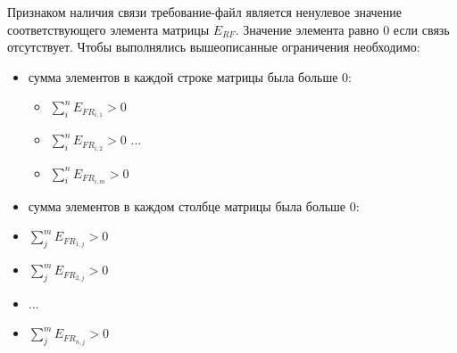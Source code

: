 \documentclass{article}
\begin{document}
  Признаком наличия связи требование-файл является ненулевое значение соответствующего элемента матрицы $E_{RF}$. Значение элемента равно $0$ если связь отсутствует. Чтобы выполнялись вышеописанные ограничения необходимо:
  \begin{itemize}
    \item сумма элементов в каждой строке матрицы была больше 0:
      \begin{itemize}
        \item $\sum^n_i E_{FR_{i, 1}} > 0$
        \item $\sum^n_i E_{FR_{i, 2}} > 0$
        ...
        \item $\sum^n_i E_{FR_{i, m}} > 0$
      \end{itemize}
    \item сумма элементов в каждом столбце матрицы была больше 0:
      \item $\sum^m_j E_{FR_{1, j}} > 0$
      \item $\sum^m_j E_{FR_{2, j}} > 0$
      \item ...
      \item $\sum^m_j E_{FR_{n, j}} > 0$
  \end{itemize}
\end{document}
